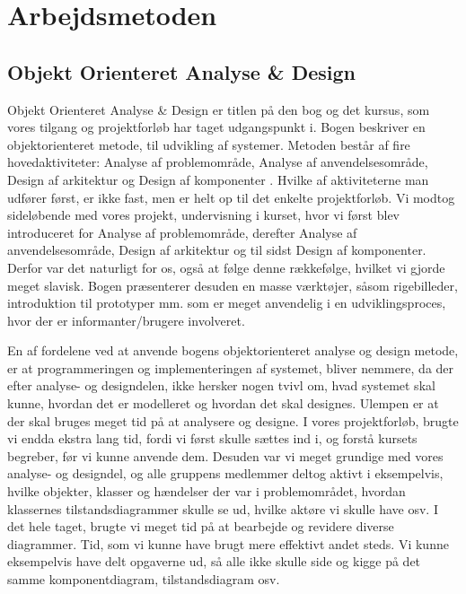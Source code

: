 \chapter{Arbejdsmetoden}
\label{arbejdsmetoden}

\section{Objekt Orienteret Analyse \& Design}
Objekt Orienteret Analyse \& Design er titlen på den bog og det kursus, som vores tilgang og projektforløb har taget udgangspunkt i. Bogen beskriver en objektorienteret metode, til udvikling af systemer. Metoden består af fire hovedaktiviteter: Analyse af problemområde, Analyse af anvendelsesområde, Design af arkitektur og Design af komponenter \cite[p~ 15]{ooad}. Hvilke af aktiviteterne man udfører først, er ikke fast, men er helt op til det enkelte projektforløb. Vi modtog sideløbende med vores projekt, undervisning i kurset, hvor vi først blev introduceret for Analyse af problemområde, derefter Analyse af anvendelsesområde, Design af arkitektur og til sidst Design af komponenter. Derfor var det naturligt for os, også at følge denne rækkefølge, hvilket vi gjorde meget slavisk. Bogen præsenterer desuden en masse værktøjer, såsom rigebilleder, introduktion til prototyper mm. som er meget anvendelig i en udviklingsproces, hvor der er informanter/brugere involveret.

En af fordelene ved at anvende bogens objektorienteret analyse og design metode, er at programmeringen og implementeringen af systemet, bliver nemmere, da der efter analyse- og designdelen, ikke hersker nogen tvivl om, hvad systemet skal kunne, hvordan det er modelleret og hvordan det skal designes. Ulempen er at der skal bruges meget tid på at analysere og designe. I vores projektforløb, brugte vi endda ekstra lang tid, fordi vi først skulle sættes ind i, og forstå kursets begreber, før vi kunne anvende dem. Desuden var vi meget grundige med vores analyse- og designdel, og alle gruppens medlemmer deltog aktivt i eksempelvis, hvilke objekter, klasser og hændelser der var i problemområdet, hvordan klassernes tilstandsdiagrammer skulle se ud, hvilke aktøre vi skulle have osv. I det hele taget, brugte vi meget tid på at bearbejde og revidere diverse diagrammer. Tid, som vi kunne have brugt mere effektivt andet steds. Vi kunne eksempelvis have delt opgaverne ud, så alle ikke skulle side og kigge på det samme komponentdiagram, tilstandsdiagram osv. 

